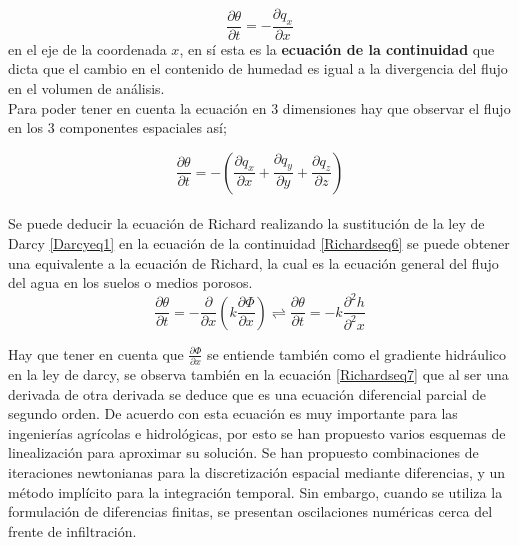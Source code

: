 $$ \frac{\partial \theta}{\partial t} = - \frac{\partial q_{x}}{\partial x }$$ en el eje de la coordenada $x$, en sí esta es la \textbf{ecuación de la continuidad} que dicta que el cambio en el contenido de humedad  es igual a la divergencia del flujo en el volumen de análisis.\\
Para poder tener en cuenta la ecuación en 3 dimensiones hay que observar el flujo en los 3 componentes espaciales así; 

\begin{equation}
	\frac{\partial \theta}{\partial t} = - (\frac{\partial q_{x}}{\partial x} + \frac{\partial q_{y}}{\partial y} + \frac{\partial q_{z}}{\partial z} )
	\label{Richardseq6}
\end{equation}\\
Se puede deducir la ecuación de Richard realizando la sustitución de la ley de Darcy \eqref{Darcyeq1} en la ecuación de la continuidad \eqref{Richardseq6} se puede obtener una equivalente a la ecuación de Richard, la cual es la ecuación general del flujo del agua en los suelos o medios porosos.
\begin{equation}
	\frac{\partial \theta}{\partial t} = - \frac{\partial}{\partial x}(k \frac{\partial \Phi}{\partial x}) \rightleftharpoons \frac{\partial \theta}{\partial t} = -k \frac{\partial^{2}h}{\partial^{2}x}
	\label{Richardseq7}
\end{equation}

Hay que tener en cuenta que $\frac{\partial \Phi}{\partial x}$ se entiende también como el gradiente hidráulico en la ley de darcy, se observa también en la ecuación \eqref{Richardseq7} que al ser una derivada de otra derivada se deduce que es una ecuación diferencial parcial  de segundo orden.     
De acuerdo con \parencite{CHAVEZNEGRETE2018168}  esta ecuación es muy importante para las ingenierías agrícolas e hidrológicas, por esto se han propuesto varios esquemas de linealización para aproximar su solución.  Se han propuesto combinaciones de iteraciones newtonianas para la discretización espacial  mediante diferencias, y un método  implícito para la integración temporal. Sin embargo, cuando se utiliza la formulación de diferencias finitas, se presentan oscilaciones numéricas cerca del frente de infiltración.\\

